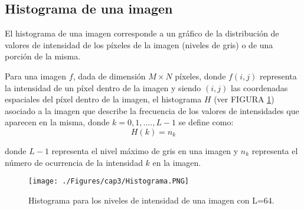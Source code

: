 

\subsection{Histograma de una imagen }


El   histograma   de   una   imagen corresponde a un gráfico de la distribución de valores  de intensidad de los píxeles  de  la  imagen (niveles de gris) o de una porción de la misma. 
%
%
%

Para una imagen $f$, dada de dimensión $ M\times N$ píxeles, donde $f(i,j)$ representa la intensidad de un píxel dentro de la imagen y siendo $(i,j)$ las coordenadas espaciales del píxel dentro de la imagen, el histograma $H$ (ver FIGURA
\ref{fig:histogram}) asociado a la imagen que describe la frecuencia de los valores de intensidades que aparecen en la misma, donde $k=0,1,....,L-1$ se define como:
\begin{equation}
\label{eq:histFormalEquation}
H(k)=n_{k}
\end{equation}

donde $L-1$ representa el nivel máximo de gris en una imagen y $n_{k}$ representa el número de ocurrencia de la intensidad $k$ en
la imagen.


\begin{figure}[H]
	\centering
		\texttt{[image: ./Figures/cap3/Histograma.PNG]}
	\caption{Histograma para los niveles de intensidad de una imagen con L=64.}
	\label{fig:histogram}
\end{figure}

